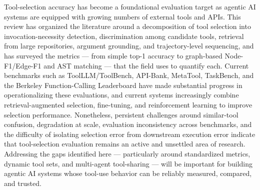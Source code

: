 \documentclass[acmsmall]{acmart}
\begin{document}
Tool-selection accuracy has become a foundational evaluation target as agentic AI systems are equipped with growing numbers of external tools and APIs. This review has organized the literature around a decomposition of tool selection into invocation-necessity detection, discrimination among candidate tools, retrieval from large repositories, argument grounding, and trajectory-level sequencing, and has surveyed the metrics --- from simple top-1 accuracy to graph-based Node-F1/Edge-F1 and AST matching --- that the field uses to quantify each. Current benchmarks such as ToolLLM/ToolBench, API-Bank, MetaTool, TaskBench, and the Berkeley Function-Calling Leaderboard have made substantial progress in operationalizing these evaluations, and current systems increasingly combine retrieval-augmented selection, fine-tuning, and reinforcement learning to improve selection performance. Nonetheless, persistent challenges around similar-tool confusion, degradation at scale, evaluation inconsistency across benchmarks, and the difficulty of isolating selection error from downstream execution error indicate that tool-selection evaluation remains an active and unsettled area of research. Addressing the gaps identified here --- particularly around standardized metrics, dynamic tool sets, and multi-agent tool-sharing --- will be important for building agentic AI systems whose tool-use behavior can be reliably measured, compared, and trusted.



\end{document}
